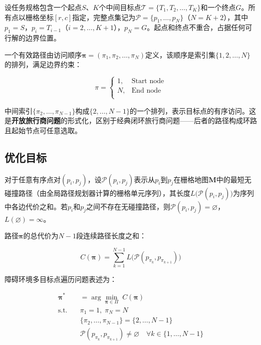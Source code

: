 \documentclass[lettersize,journal]{IEEEtran}
\begin{document}
\label{subsec:otspp}

设任务规格包含一个起点$S$、$K$个中间目标点$\mathcal{T} = \{T_1, T_2, \dots, T_K\}$和一个终点$G$。所有点以栅格坐标$[r, c]$指定，完整点集记为$\mathcal{P} = \{p_1, \dots, p_N\}$（$N = K + 2$），其中$p_1 = S$，$p_i = T_{i-1}$（$i = 2, \dots, K+1$），$p_N = G$。起点和终点不重合，占据任何可行解的边界位置。

一个有效路径由访问顺序$\bm{\pi} = (\pi_1, \pi_2, \dots, \pi_N)$定义，该顺序是索引集$\{1, 2, \dots, N\}$的排列，满足边界约束：

\begin{equation}
\pi =
\begin{cases}
1, & \text{Start node} \\
N, & \text{End node} \\
\end{cases}
\label{eq:boundary}
\end{equation}

中间索引$\{\pi_2, \dots, \pi_{N-1}\}$构成$\{2, \dots, N-1\}$的一个排列，表示目标点的有序访问。这是\textbf{开放旅行商问题}的形式化，区别于经典闭环旅行商问题——后者的路径构成环路且起始节点可任意选取\textcolor{blue}{\cite{ref4,ref36}}。

\subsection{优化目标}

对于任意有序点对$(p_i, p_j)$，设$\mathcal{P}(p_i, p_j)$表示从$p_i$到$p_j$在栅格地图$\mathbf{M}$中的最短无碰撞路径（由全局路径规划器计算的栅格单元序列），其长度$L\big(\mathcal{P}(p_i, p_j)\big)$为序列中各边代价之和。若$p_i$和$p_j$之间不存在无碰撞路径，则$\mathcal{P}(p_i, p_j) = \varnothing$，$L(\varnothing) = \infty$。

路径$\bm{\pi}$的总代价为$N-1$段连续路径长度之和：

\begin{equation}
C(\bm{\pi}) = \sum_{k=1}^{N-1} L\big(\mathcal{P}(p_{\pi_k}, p_{\pi_{k+1}})\big)
\label{eq:totalcost}
\end{equation}

障碍环境多目标点遍历问题表述为：

\begin{align}
\bm{\pi}^{*} &= \arg\min_{\bm{\pi} \in \Pi} \; C(\bm{\pi})
\label{eq:opt}\\
\text{s.t.} \quad &\pi_1 = 1,\; \pi_N = N \nonumber\\
&\{\pi_2, \dots, \pi_{N-1}\} = \{2, \dots, N-1\} \nonumber\\
&\mathcal{P}(p_{\pi_k}, p_{\pi_{k+1}}) \neq \varnothing \quad \forall k \in \{1, \dots, N-1\} \nonumber
\end{align}
\end{document}
